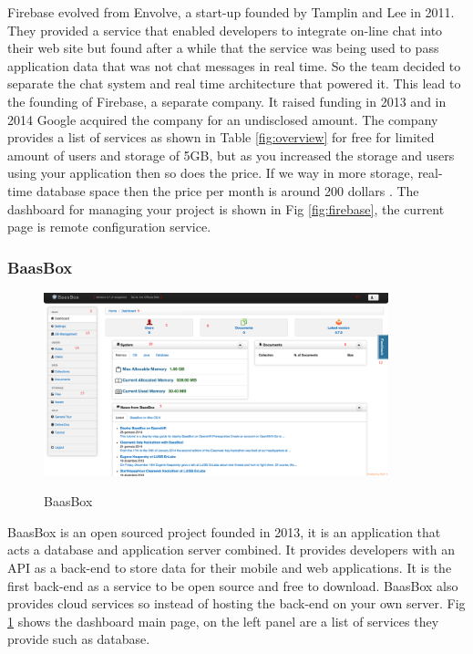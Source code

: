 Firebase \cite{firebase}  evolved from Envolve, a start-up founded by Tamplin and Lee in 2011. They provided a service that enabled developers to integrate on-line chat into their web site but found after a while that the service was being used to pass application data that was not chat messages in real time. So the team decided to separate the chat system and real time architecture that powered it. This lead to the founding of Firebase, a separate company. 
It raised funding in 2013 and in 2014 Google acquired the company for an undisclosed amount. The company provides a list of services as shown in Table \ref{fig:overview} for free for limited amount of users and storage of 5GB, but as you increased the storage and users using your application then so does the price. If we way in more storage, real-time database space then the price per month is around 200 dollars \cite{firebase2}. The dashboard for managing your project is shown in Fig \ref{fig:firebase}, the current page is remote configuration service.

\subsubsection{BaasBox}

\begin{figure}[!h]
    \caption{BaasBox}
    \centering
    \includegraphics[width=100mm]{images/baasbox}
    \label{fig:baasbox}
\end{figure}

BaasBox \cite{baasBox} is an open sourced project founded in 2013, it is an application that acts a database and application server combined. It provides developers with an API as a back-end to store data for their mobile and web applications. It is the first back-end as a service to be open source and free to download. BaasBox also provides cloud services so instead of hosting the back-end on your own server. Fig \ref{fig:baasbox} shows the dashboard main page, on the left panel are a list of services they provide such as database.


